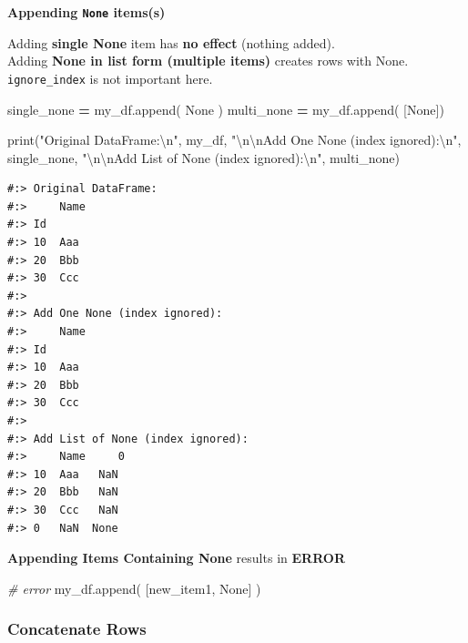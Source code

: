 \documentclass[
]{book}
\newenvironment{Shaded}{\begin{snugshade}}{\end{snugshade}}
\newcommand{\BuiltInTok}[1]{#1}
\newcommand{\CharTok}[1]{\textcolor[rgb]{0.5,0.5,0.5}{#1}}
\newcommand{\CommentTok}[1]{\textcolor[rgb]{0.37,0.37,0.37}{\textit{#1}}}
\newcommand{\NormalTok}[1]{#1}
\newcommand{\OperatorTok}[1]{\textcolor[rgb]{0.43,0.43,0.43}{\textbf{#1}}}
\newcommand{\StringTok}[1]{\textcolor[rgb]{0.5,0.5,0.5}{#1}}
\newcommand{\VariableTok}[1]{\textcolor[rgb]{0,0,0}{#1}}
\begin{document}
\textbf{Appending \texttt{None} items(s)}

Adding \textbf{single None} item has \textbf{no effect} (nothing added).\\
Adding \textbf{None in list form (multiple items)} creates rows with None.\\
\texttt{ignore\_index} is not important here.

\begin{Shaded}
\begin{Highlighting}[]
\NormalTok{single_none }\OperatorTok{=}\NormalTok{ my_df.append( }\VariableTok{None}\NormalTok{  )}
\NormalTok{multi_none  }\OperatorTok{=}\NormalTok{ my_df.append( [}\VariableTok{None}\NormalTok{])}

\BuiltInTok{print}\NormalTok{(}\StringTok{"Original DataFrame:}\CharTok{\textbackslash{}n}\StringTok{"}\NormalTok{, my_df,}
      \StringTok{"}\CharTok{\textbackslash{}n\textbackslash{}n}\StringTok{Add One None (index ignored):}\CharTok{\textbackslash{}n}\StringTok{"}\NormalTok{, single_none,}
      \StringTok{"}\CharTok{\textbackslash{}n\textbackslash{}n}\StringTok{Add List of None (index ignored):}\CharTok{\textbackslash{}n}\StringTok{"}\NormalTok{, multi_none)}
\end{Highlighting}
\end{Shaded}

\begin{verbatim}
#:> Original DataFrame:
#:>     Name
#:> Id     
#:> 10  Aaa
#:> 20  Bbb
#:> 30  Ccc 
#:> 
#:> Add One None (index ignored):
#:>     Name
#:> Id     
#:> 10  Aaa
#:> 20  Bbb
#:> 30  Ccc 
#:> 
#:> Add List of None (index ignored):
#:>     Name     0
#:> 10  Aaa   NaN
#:> 20  Bbb   NaN
#:> 30  Ccc   NaN
#:> 0   NaN  None
\end{verbatim}

\textbf{Appending Items Containing None} results in \textbf{ERROR}

\begin{Shaded}
\begin{Highlighting}[]
\CommentTok{# error}
\NormalTok{my_df.append( [new_item1, }\VariableTok{None}\NormalTok{] )}
\end{Highlighting}
\end{Shaded}

\hypertarget{concatenate-rows}{%
\subsubsection{Concatenate Rows}\label{concatenate-rows}}
\end{document}

